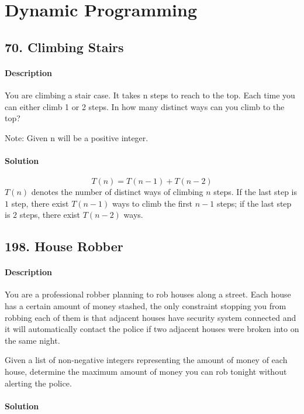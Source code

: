 \section{Dynamic Programming}

\subsection{70. Climbing Stairs}

\paragraph{Description}

You are climbing a stair case. It takes n steps to reach to the top.
Each time you can either climb 1 or 2 steps. In how many distinct ways can you climb to the top?

Note: Given n will be a positive integer.

\paragraph{Solution}

$$T(n)=T(n-1)+T(n-2)$$
$T(n)$ denotes the number of distinct ways of climbing $n$ steps. If the last step is $1$ step, there exist $T(n-1)$ ways to climb the first $n-1$ steps; if the last step is $2$ steps, there exist $T(n-2)$ ways.

\subsection{198. House Robber}

\paragraph{Description}

You are a professional robber planning to rob houses along a street. Each house has a certain amount of money stashed, the only constraint stopping you from robbing each of them is that adjacent houses have security system connected and it will automatically contact the police if two adjacent houses were broken into on the same night.

Given a list of non-negative integers representing the amount of money of each house, determine the maximum amount of money you can rob tonight without alerting the police.

\paragraph{Solution}

